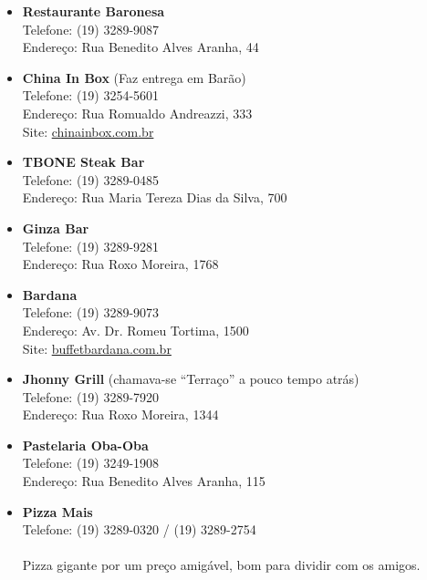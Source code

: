 \begin{itemize}
    \item   \textbf{Restaurante Baronesa}
        \\Telefone: (19) 3289-9087
        \\Endereço: Rua Benedito Alves Aranha, 44

    \item   \textbf{China In Box} (Faz entrega em Barão)
        \\Telefone: (19) 3254-5601
        \\Endereço: Rua Romualdo Andreazzi, 333
        \\Site: \url{chinainbox.com.br}

    \item   \textbf{TBONE Steak Bar}
        \\Telefone: (19) 3289-0485
        \\Endereço: Rua Maria Tereza Dias da Silva, 700

    \item   \textbf{Ginza Bar}
        \\Telefone: (19) 3289-9281
        \\Endereço: Rua Roxo Moreira, 1768

    \item   \textbf{Bardana}
        \\Telefone: (19) 3289-9073
        \\Endereço: Av. Dr. Romeu Tortima, 1500
        \\Site: \url{buffetbardana.com.br}

    \item   \textbf{Jhonny Grill} (chamava-se ``Terraço'' a pouco tempo atrás)
        \\Telefone: (19) 3289-7920
        \\Endereço: Rua Roxo Moreira, 1344

    \item   \textbf{Pastelaria Oba-Oba}
        \\Telefone: (19) 3249-1908
        \\Endereço: Rua Benedito Alves Aranha, 115

    \item   \textbf{Pizza Mais}
        \\Telefone: (19) 3289-0320 / (19) 3289-2754
        \\\\Pizza gigante por um preço amigável, bom para dividir com os amigos.


\end{itemize}
